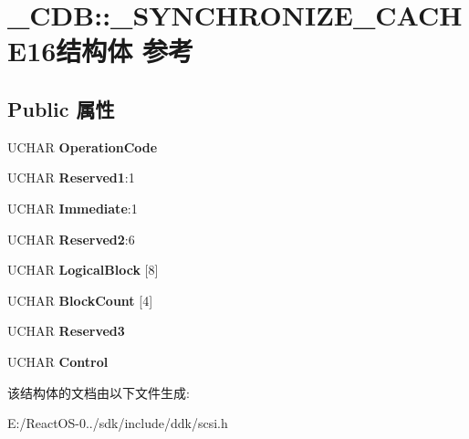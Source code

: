 \hypertarget{struct___c_d_b_1_1___s_y_n_c_h_r_o_n_i_z_e___c_a_c_h_e16}{}\section{\+\_\+\+C\+DB\+:\+:\+\_\+\+S\+Y\+N\+C\+H\+R\+O\+N\+I\+Z\+E\+\_\+\+C\+A\+C\+H\+E16结构体 参考}
\label{struct___c_d_b_1_1___s_y_n_c_h_r_o_n_i_z_e___c_a_c_h_e16}
\subsection*{Public 属性}
\begin{DoxyCompactItemize}
\item 
\mbox{\label{struct___c_d_b_1_1___s_y_n_c_h_r_o_n_i_z_e___c_a_c_h_e16_adcbe5dffc44f98466d14f016327e128f}} 
U\+C\+H\+AR {\bfseries Operation\+Code}
\item 
\mbox{\label{struct___c_d_b_1_1___s_y_n_c_h_r_o_n_i_z_e___c_a_c_h_e16_a7dfb84566729025b4216a92878d59b2c}} 
U\+C\+H\+AR {\bfseries Reserved1}\+:1
\item 
\mbox{\label{struct___c_d_b_1_1___s_y_n_c_h_r_o_n_i_z_e___c_a_c_h_e16_a2d203363c2d427d59b8c9c3db09d3fcd}} 
U\+C\+H\+AR {\bfseries Immediate}\+:1
\item 
\mbox{\label{struct___c_d_b_1_1___s_y_n_c_h_r_o_n_i_z_e___c_a_c_h_e16_a97acc3717bf35c41884e52f57b806019}} 
U\+C\+H\+AR {\bfseries Reserved2}\+:6
\item 
\mbox{\label{struct___c_d_b_1_1___s_y_n_c_h_r_o_n_i_z_e___c_a_c_h_e16_a8d9c662cb80f7605b3d09bfde5624088}} 
U\+C\+H\+AR {\bfseries Logical\+Block} \mbox{[}8\mbox{]}
\item 
\mbox{\label{struct___c_d_b_1_1___s_y_n_c_h_r_o_n_i_z_e___c_a_c_h_e16_afdec60b28892a2e32951e2859dc27cf0}} 
U\+C\+H\+AR {\bfseries Block\+Count} \mbox{[}4\mbox{]}
\item 
\mbox{\label{struct___c_d_b_1_1___s_y_n_c_h_r_o_n_i_z_e___c_a_c_h_e16_a252f0bb8aa16b71c72395ad14c763960}} 
U\+C\+H\+AR {\bfseries Reserved3}
\item 
\mbox{\label{struct___c_d_b_1_1___s_y_n_c_h_r_o_n_i_z_e___c_a_c_h_e16_a801656287f733bada3dd1879f69f84f2}} 
U\+C\+H\+AR {\bfseries Control}
\end{DoxyCompactItemize}


该结构体的文档由以下文件生成\+:\begin{DoxyCompactItemize}
\item 
E\+:/\+React\+O\+S-\/0../sdk/include/ddk/scsi.\+h\end{DoxyCompactItemize}
